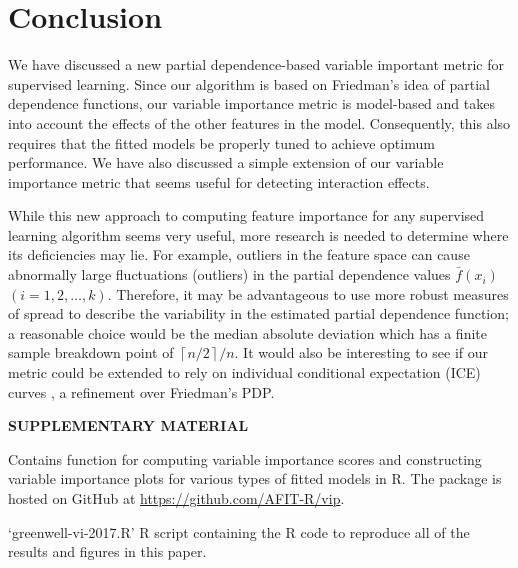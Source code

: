 \documentclass[12pt]{article}
\newcommand{\pkg}[1]{\texorpdfstring%
{{\normalfont\fontseries{b}\selectfont #1}}%
{#1}}
\newcommand{\file}[1]{{`\normalfont\textsf{#1}'}}
\def\pkg#1{\textbf{\texttt{#1}}}
\begin{document}
\section{Conclusion}
\label{sec:conc}

We have discussed a new partial dependence-based variable important metric for supervised learning. Since our algorithm is based on Friedman's idea of partial dependence functions, our variable importance metric is model-based and takes into account the effects of the other features in the model. Consequently, this also requires that the fitted models be properly tuned to achieve optimum performance. We have also discussed a simple extension of our variable importance metric that seems useful for detecting interaction effects.

While this new approach to computing feature importance for any supervised learning algorithm seems very useful, more research is needed to determine where its deficiencies may lie. For example, outliers in the feature space can cause abnormally large fluctuations (outliers) in the partial dependence values $\bar{f}\left(x_{i}\right)$ $\left(i = 1, 2, \dots, k\right)$. Therefore, it may be advantageous to use more robust measures of spread to describe the variability in the estimated partial dependence function; a reasonable choice would be the median absolute deviation which has a finite sample breakdown point of $\left\lceil{n / 2}\right\rceil / n$. It would also be interesting to see if our metric could be extended to rely on individual conditional expectation (ICE) curves \citep{goldstein-peeking-2015}, a refinement over Friedman's PDP.




\bigskip
\begin{center}
{\large\bf SUPPLEMENTARY MATERIAL}
\end{center}

\begin{description}

\item[R-package \pkg{vip}:] Contains function for computing variable importance scores and constructing variable importance plots for various types of fitted models in R. The package is hosted on GitHub at \url{https://github.com/AFIT-R/vip}.

\item{\file{greenwell-vi-2017.R}} R script containing the R code to reproduce all of the results and figures in this paper.

\end{description}






\end{document}
